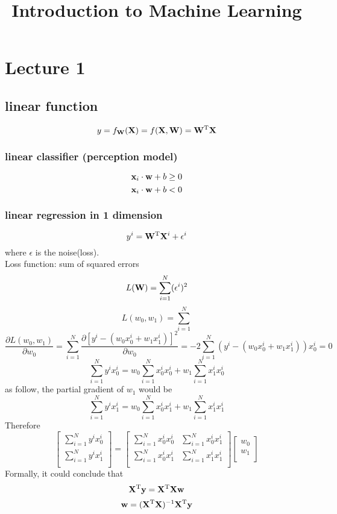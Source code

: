\documentclass[12pt,a4paper]{article}
\title{Introduction to Machine Learning}
\begin{document}
 

\baselineskip24pt
\maketitle 

\section{Lecture 1}
\subsection*{linear function}
$$
y = f_{\bf W}({\bf X})=f({\bf X,W})={\bf W^{\rm T}X}
$$
\subsubsection*{linear classifier (perception model)}
$$
{\bf x}_i \cdot {\bf w}+b \geq 0
$$
$$
{\bf x}_i \cdot {\bf w}+b < 0
$$
\subsubsection*{linear regression in 1 dimension}
$$
y^i = {\bf W}^{\rm T}{\bf X}^i+\epsilon^i
$$
where $\epsilon$ is the noise(loss).\\
Loss function: sum of squared errors
$$
L({\bf W}) = \sum_{i=1}^{N}(\epsilon^i)
^2$$
$$
L(w_0,w_1) = \sum_{i=1}^{N}
$$
$$
\frac{\partial L(w_0,w_1)}{\partial w_0} = \sum_{i=1}^{N} \frac{\partial[y^i-(w_0x_0^i+w_1x_1^i)]^2}{\partial w_0} = -2\sum_{i=1}^{N}(y^i-(w_0x_0^i+w_1x_1^i))x_0^i = 0
$$
$$
\sum_{i=1}^{N}y^ix^i_0 = w_0\sum_{i=1}^{N}x_0^ix_0^i+w_1\sum_{i=1}^{N}x_1^ix_0^i
$$
as follow, the partial gradient of $w_1$ would be 
$$
\sum_{i=1}^{N}y^ix^i_1 = w_0\sum_{i=1}^{N}x_0^ix_1^i+w_1\sum_{i=1}^{N}x_1^ix_1^i
$$
Therefore
\begin{equation}
\left[
\begin{matrix}
\sum_{i=1}^{N}y^ix_0^i \\
\sum_{i=1}^{N}y^ix_1^i \\
\end{matrix}
\right]=
\left[
\begin{matrix}
\sum_{i=1}^{N}x^i_0x_0^i & \sum_{i=1}^{N}x_0^ix_1^i \\
\sum_{i=1}^{N}x_0^ix_1^i & \sum_{i=1}^{N}x_1^ix_1^i \\
\end{matrix}
\right]
\left[
\begin{matrix}
w_0 \\
w_1 \\
\end{matrix}
\right]
\end{equation}
Formally, it could conclude that
$$
{\bf X}^{\rm T}{\bf y} = {\bf X}^{\rm T}{\bf X}{\bf w}
$$
$$
{\bf w} = ({\bf X}^{\rm T}{\bf X})^{-1}{\bf X}^{\rm T}{\bf y}
$$
\end{document}
